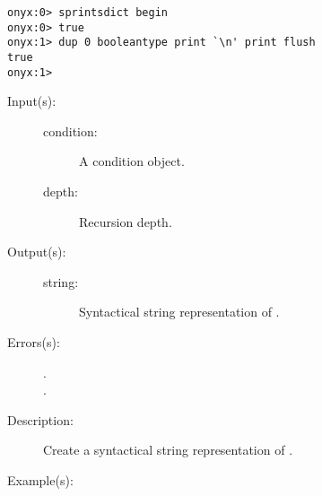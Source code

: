 \begin{description}
\begin{description}
\begin{verbatim}
onyx:0> sprintsdict begin
onyx:0> true
onyx:1> dup 0 booleantype print `\n' print flush
true
onyx:1>
		\end{verbatim}
	\end{description}
\label{sprintsdict:conditiontype}
\item[{\onyxop{condition depth}{conditiontype}{string}}: ]
	\begin{description}\item[]
	\item[Input(s): ]
		\begin{description}\item[]
		\item[condition: ]
			A condition object.
		\item[depth: ]
			Recursion depth.
		\end{description}
	\item[Output(s): ]
		\begin{description}\item[]
		\item[string: ]
			Syntactical string representation of .
		\end{description}
	\item[Errors(s): ]
		\begin{description}\item[]
		\item[.]
		\item[.]
		\end{description}
	\item[Description: ]
		Create a syntactical string representation of .
	\item[Example(s): ]\begin{verbatim}


\end{verbatim}
\end{description}
\end{description}
